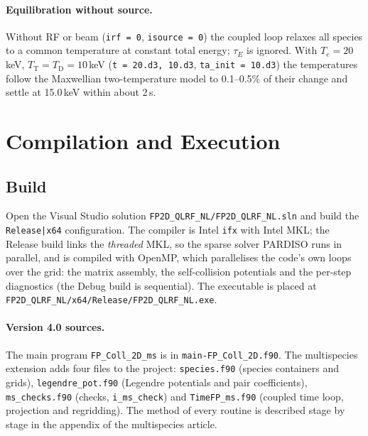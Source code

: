 \documentclass[11pt,a4paper]{article}
\begin{document}
\paragraph{Equilibration without source.}  Without RF or beam (\texttt{irf = 0},
\texttt{isource = 0}) the coupled loop relaxes all species to a common temperature at constant total
energy; $\tau_E$ is ignored.  With $T_e=20$\,keV, $T_\mathrm T=T_\mathrm D=10$\,keV
(\texttt{t = 20.d3, 10.d3}, \texttt{ta\_init = 10.d3}) the temperatures follow the Maxwellian
two-temperature model to 0.1--0.5\% of their change and settle at 15.0\,keV within about 2\,s.


\section{Compilation and Execution}

\subsection{Build}

Open the Visual Studio solution
\texttt{FP2D\_QLRF\_NL/FP2D\_QLRF\_NL.sln} and build the
\texttt{Release|x64} configuration.  The compiler is Intel \texttt{ifx}
with Intel MKL; the Release build links the \emph{threaded} MKL, so the
sparse solver PARDISO runs in parallel, and is compiled with OpenMP, which
parallelises the code's own loops over the grid: the matrix assembly, the
self-collision potentials and the per-step diagnostics (the Debug build is
sequential).  The executable is placed at
\texttt{FP2D\_QLRF\_NL/x64/Release/FP2D\_QLRF\_NL.exe}.

\paragraph{Version 4.0 sources.}  The main program \texttt{FP\_Coll\_2D\_ms} is in
\texttt{main-FP\_Coll\_2D.f90}.  The multispecies extension adds four files to the project:
\texttt{species.f90} (species containers and grids), \texttt{legendre\_pot.f90} (Legendre
potentials and pair coefficients), \texttt{ms\_checks.f90} (checks, \texttt{i\_ms\_check}) and
\texttt{TimeFP\_ms.f90} (coupled time loop, projection and regridding).  The method of every routine is
described stage by stage in the appendix of the multispecies article.
\end{document}
